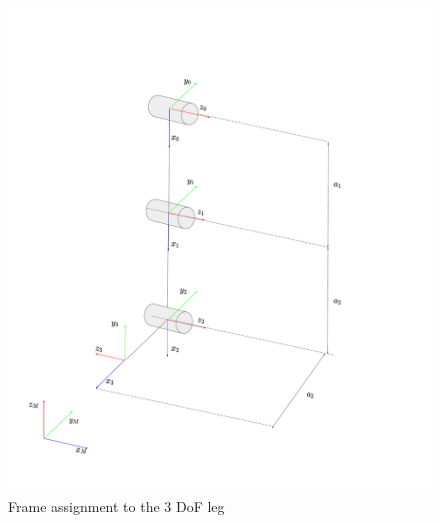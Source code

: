 \documentclass[a4paper]{article}
\begin{document}
\begin{figure}
\centering
\includegraphics[scale=0.4]{plot/kinematic/3dof_leg.pdf} 
\caption{Frame assignment to the 3 DoF leg} 
\label{fig:3dof_frame}
\end{figure}
\end{document}
